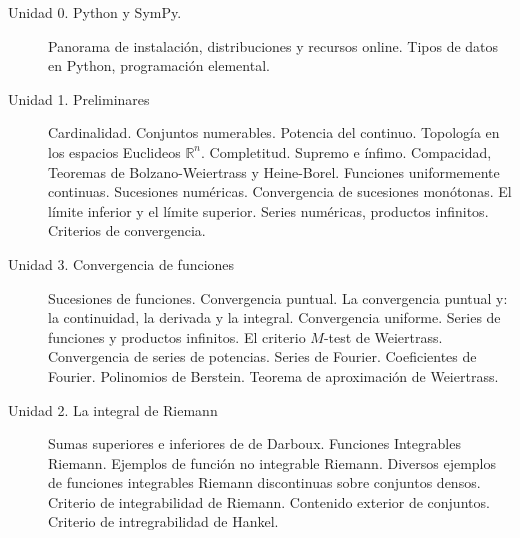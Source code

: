 \documentclass[12pt]{article}
\begin{document}
\begin{description}
 \item[Unidad 0. Python y SymPy.] Panorama de instalación, distribuciones y recursos online. Tipos de datos en Python, programación elemental.

\item[Unidad 1. Preliminares] Cardinalidad. Conjuntos numerables. Potencia del continuo. Topología en los espacios Euclideos $\mathbb{R}^n$. Completitud. Supremo e ínfimo. Compacidad, Teoremas de Bolzano-Weiertrass y Heine-Borel. Funciones uniformemente continuas. Sucesiones numéricas. Convergencia de sucesiones monótonas. El límite inferior y el límite superior. Series numéricas, productos infinitos. Criterios de convergencia. 


\item[Unidad 3. Convergencia de funciones] Sucesiones de funciones. Convergencia puntual. La convergencia puntual y: la continuidad, la derivada y la integral. Convergencia uniforme. Series de funciones y productos infinitos. El criterio $M$-test de Weiertrass. Convergencia de series de potencias. Series de Fourier. Coeficientes de Fourier. Polinomios de Berstein. Teorema de aproximación de Weiertrass.

\item[Unidad 2. La integral de Riemann] Sumas superiores e inferiores de de Darboux. Funciones Integrables Riemann. Ejemplos de función no integrable Riemann. Diversos ejemplos de funciones integrables Riemann discontinuas sobre conjuntos densos.  Criterio de integrabilidad de Riemann. Contenido exterior de conjuntos. Criterio de intregrabilidad de Hankel. 

\end{description}













%
%
\nocite{*}

  
\end{document}
